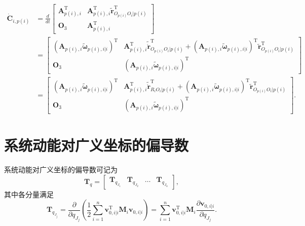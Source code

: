 \begin{equation}\label{eq:11.8}
\begin{aligned}
\dot{\boldsymbol{C}}_{i,p(i)} &= \frac{d}{dt}
\begin{bmatrix}
\boldsymbol{A}_{p(i),i}^{\mathrm{T}} & \boldsymbol{A}_{p(i),i}^{\mathrm{T}} \tilde{\boldsymbol{r}}_{O_{p(i)}O_i|p(i)}^{\mathrm{T}} \\[4pt]
\boldsymbol{O}_3 & \boldsymbol{A}_{p(i),i}^{\mathrm{T}}
\end{bmatrix} \\[8pt]
&=
\begin{bmatrix}
\left( \boldsymbol{A}_{p(i),i} \tilde{\boldsymbol{\omega}}_{p(i),i|i} \right)^{\mathrm{T}} &
\boldsymbol{A}_{p(i),i}^{\mathrm{T}} \tilde{\dot{\boldsymbol{r}}}_{O_{p(i)}O_i|p(i)}^{\mathrm{T}} + \left( \boldsymbol{A}_{p(i),i} \tilde{\boldsymbol{\omega}}_{p(i),i|i} \right)^{\mathrm{T}} \tilde{\boldsymbol{r}}_{O_{p(i)}O_i|p(i)}^{\mathrm{T}} \\[6pt]
\boldsymbol{O}_3 & \left( \boldsymbol{A}_{p(i),i} \tilde{\boldsymbol{\omega}}_{p(i),i|i} \right)^{\mathrm{T}}
\end{bmatrix} \\[8pt]
&=
\begin{bmatrix}
\left( \boldsymbol{A}_{p(i),i} \tilde{\boldsymbol{\omega}}_{p(i),i|i} \right)^{\mathrm{T}} &
\boldsymbol{A}_{p(i),i}^{\mathrm{T}} \tilde{\dot{\boldsymbol{r}}}_{R_iO_i|p(i)}^{\mathrm{T}} + \left( \boldsymbol{A}_{p(i),i} \tilde{\boldsymbol{\omega}}_{p(i),i|i} \right)^{\mathrm{T}} \tilde{\boldsymbol{r}}_{O_{p(i)}O_i|p(i)}^{\mathrm{T}} \\[6pt]
\boldsymbol{O}_3 & \left( \boldsymbol{A}_{p(i),i} \tilde{\boldsymbol{\omega}}_{p(i),i|i} \right)^{\mathrm{T}}
\end{bmatrix}.
\end{aligned}
\end{equation}

\section{系统动能对广义坐标的偏导数}

系统动能对广义坐标的偏导数可记为
\begin{equation}\label{eq:11.9}
\boldsymbol{T}_{q} = \begin{bmatrix}
\boldsymbol{T}_{q_{J_1}} & \boldsymbol{T}_{q_{J_2}} & \ldots & \boldsymbol{T}_{q_{J_n}}
\end{bmatrix},
\end{equation}
其中各分量满足
\begin{equation}\label{eq:11.10}
\boldsymbol{T}_{q_{J_j}} = \frac{\partial}{\partial q_{J_j}} \left( \frac{1}{2} \sum_{i=1}^{n} \boldsymbol{v}_{0,i|i}^{\mathrm{T}} \boldsymbol{M}_i \boldsymbol{v}_{0,i|i} \right) = \sum_{i=1}^{n} \boldsymbol{v}_{0,i|i}^{\mathrm{T}} \boldsymbol{M}_i \frac{\partial \boldsymbol{v}_{0,i|i}}{\partial q_{J_j}}.
\end{equation}

